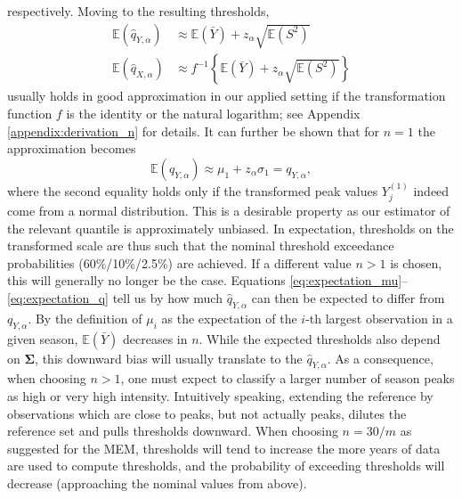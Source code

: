 \documentclass{article}
\newcommand{\sd}{s}
\begin{document}
respectively. Moving to the resulting thresholds,
\begin{align}
\mathbb{E}(\hat{q}_{Y, \alpha}) & \approx \mathbb{E}(\bar{Y}) + z_\alpha \sqrt{\mathbb{E}(S^2)}
\label{eq:expectation_q}\\
\mathbb{E}(\hat{q}_{X, \alpha}) & \approx f^{-1}\left\{\mathbb{E}(\bar{Y}) + z_\alpha \sqrt{\mathbb{E}(S^2)}\right\}
\label{eq:expectation_q2}
\end{align}
usually holds in good approximation in our applied setting if the transformation function $f$ is the identity or the natural logarithm; see Appendix \ref{appendix:derivation_n} for details. It can further be shown that for $n = 1$ the approximation becomes
$$
\mathbb{E}(\hat{q}_{Y, \alpha}) \approx \mu_1 + z_\alpha \sigma_1 = q_{Y, \alpha},
$$
where the second equality holds only if the transformed peak values $Y_{j}^{(1)}$ indeed come from a normal distribution.  This is a desirable property as our estimator of the relevant quantile is approximately unbiased. In expectation, thresholds on the transformed scale are thus such that the nominal threshold exceedance probabilities (60\%/10\%/2.5\%) are achieved. If a different value $n > 1$ is chosen, this will generally no longer be the case. Equations \eqref{eq:expectation_mu}--\eqref{eq:expectation_q} tell us by how much $\hat{q}_{Y, \alpha}$ can then be expected to differ from $q_{Y, \alpha}$. By the definition of $\mu_i$ as the expectation of the $i$-th largest observation in a given season, $\mathbb{E}(\bar{Y})$ decreases in $n$. While the expected thresholds also depend on $\mathbf{\Sigma}$, this downward bias will usually translate to the $\hat{q}_{Y, \alpha}$. As a consequence, when choosing $n > 1$, one must expect to classify a larger number of season peaks as high or very high intensity. Intuitively speaking, extending the reference by observations which are close to peaks, but not actually peaks, dilutes the reference set and pulls thresholds downward. When choosing $n = 30/m$ as suggested for the MEM, thresholds will tend to increase the more years of data are used to compute thresholds, and the probability of exceeding thresholds will decrease (approaching the nominal values from above). 

\end{document}
